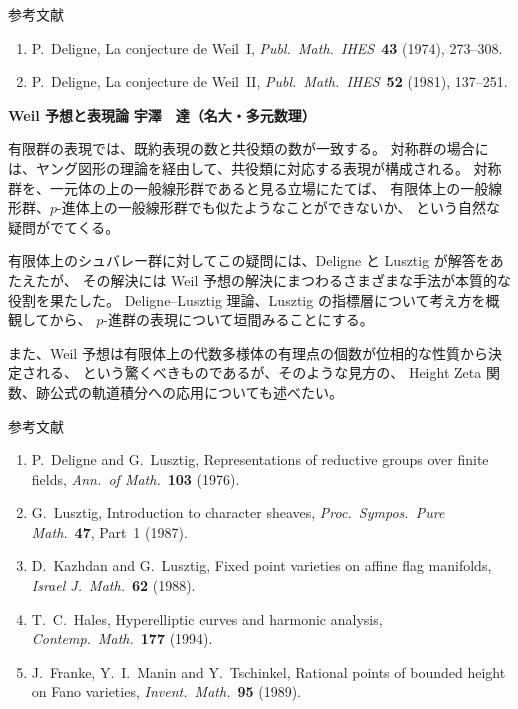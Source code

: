 \documentclass[uplatex,dvipdfmx]{jlreq}
\begin{document}
\vspace{6pt}

\begin{center}
  \textsc{参考文献}
\end{center}
\begin{enumerate}
  \item[{[Weil1]}] P.~Deligne,
        La conjecture de Weil~I,
        \textit{Publ.~Math.~IHES}~\textbf{43} (1974), 273--308.
  \item[{[Weil2]}] P.~Deligne,
        La conjecture de Weil~II,
        \textit{Publ.~Math.~IHES}~\textbf{52} (1981), 137--251.
\end{enumerate}

\newpage

\noindent
{\large\bfseries Weil 予想と表現論}
\hfill
{\large\bfseries 宇澤　達（名大・多元数理）}

\bigskip

有限群の表現では、既約表現の数と共役類の数が一致する。
対称群の場合には、ヤング図形の理論を経由して、共役類に対応する表現が構成される。
対称群を、一元体の上の一般線形群であると見る立場にたてば、
有限体上の一般線形群、$p$-進体上の一般線形群でも似たようなことができないか、
という自然な疑問がでてくる。

有限体上のシュバレー群に対してこの疑問には、Deligne と Lusztig が解答をあたえたが、
その解決には Weil 予想の解決にまつわるさまざまな手法が本質的な役割を果たした。
Deligne--Lusztig 理論、Lusztig の指標層について考え方を概観してから、
$p$-進群の表現について垣間みることにする。

また、Weil 予想は有限体上の代数多様体の有理点の個数が位相的な性質から決定される、
という驚くべきものであるが、そのような見方の、
Height Zeta 関数、跡公式の軌道積分への応用についても述べたい。

\vspace{6pt}

\begin{center}
  \textsc{参考文献}
\end{center}
\begin{enumerate}
  \item[{[DL]}] P.~Deligne and G.~Lusztig,
        Representations of reductive groups over finite fields,
        \textit{Ann.~of Math.}~\textbf{103} (1976).
  \item[{[Lu]}] G.~Lusztig,
        Introduction to character sheaves,
        \textit{Proc.~Sympos.~Pure Math.}~\textbf{47}, Part~1 (1987).
  \item[{[KL]}] D.~Kazhdan and G.~Lusztig,
        Fixed point varieties on affine flag manifolds,
        \textit{Israel J.~Math.}~\textbf{62} (1988).
  \item[{[Ha]}] T.~C.~Hales,
        Hyperelliptic curves and harmonic analysis,
        \textit{Contemp.~Math.}~\textbf{177} (1994).
  \item[{[FMT]}] J.~Franke, Y.~I.~Manin and Y.~Tschinkel,
        Rational points of bounded height on Fano varieties,
        \textit{Invent.~Math.}~\textbf{95} (1989).
\end{enumerate}
\end{document}
